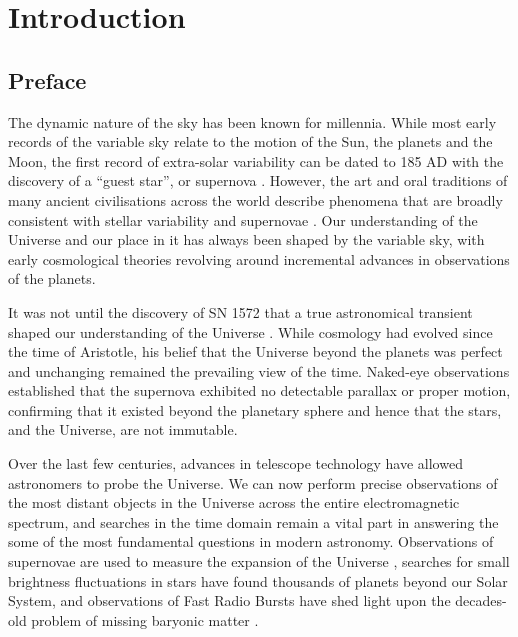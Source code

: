 \chapter{Introduction}
\label{chap:intro}
\section{Preface}
The dynamic nature of the sky has been known for millennia. While most early records of the variable sky relate to the motion of the Sun, the planets and the Moon, the first record of extra-solar variability can be dated to 185 AD with the discovery of a ``guest star'', or supernova \citep{2006ChJAA...6..635Z}. However, the art and oral traditions of many ancient civilisations across the world describe phenomena that are broadly consistent with stellar variability \citep{2018AuJAn..29...89H} and supernovae \citep[][and references therein]{2014JAHH...17..161H}. Our understanding of the Universe and our place in it has always been shaped by the variable sky, with early cosmological theories revolving around incremental advances in observations of the planets.

It was not until the discovery of SN 1572 that a true astronomical transient shaped our understanding of the Universe \citep{1969dnen.book.....B}. While cosmology had evolved since the time of Aristotle, his belief that the Universe beyond the planets was perfect and unchanging remained the prevailing view of the time. Naked-eye observations established that the supernova exhibited no detectable parallax or proper motion, confirming that it existed beyond the planetary sphere and hence that the stars, and the Universe, are not immutable.

Over the last few centuries, advances in telescope technology have allowed astronomers to probe the Universe. We can now perform precise observations of the most distant objects in the Universe across the entire electromagnetic spectrum, and searches in the time domain remain a vital part in answering the some of the most fundamental questions in modern astronomy. Observations of supernovae are used to measure the expansion of the Universe \citep{1998AJ....116.1009R}, searches for small brightness fluctuations in stars have found thousands of planets beyond our Solar System, and observations of Fast Radio Bursts have shed light upon the decades-old problem of missing baryonic matter \citep{2020Natur.581..391M}.

